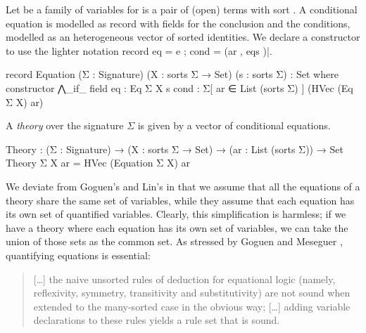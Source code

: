 Let  be a family of
variables for  is a pair of (open)
terms with sort . A conditional equation is modelled as record with
fields for the conclusion and the conditions, modelled as an
heterogeneous vector of sorted identities. We declare a constructor
to use the lighter notation record {
  eq = e ; cond = (ar , eqs )}|.
\begin{spec}
record Equation (Σ : Signature) (X : sorts Σ → Set) (s : sorts Σ) : Set where
  constructor ⋀_if_
  field
    eq     :   Eq Σ X s
    cond   :   Σ[ ar ∈ List (sorts Σ) ] (HVec (Eq Σ X) ar)
\end{spec}
\noindent A \emph{theory} over the signature $\Sigma$ is given by a
vector of conditional equations.
\begin{spec}
Theory : (Σ : Signature) → (X : sorts Σ → Set) → (ar : List (sorts Σ)) → Set
Theory Σ X ar = HVec (Equation Σ X) ar
\end{spec}
We deviate from Goguen's and Lin's in that we assume that all the
equations of a theory share the same set of variables, while they
assume that each equation has its own set of quantified
variables. Clearly, this simplification is harmless; if we have a
theory where each equation has its own set of variables, we can take
the union of those sets as the common set. As stressed by Goguen and
Meseguer \cite{goguen-remarks-87}, quantifying equations is essential:
\begin{quote}
  [\ldots] the naive unsorted rules of deduction for equational logic
  (namely, reflexivity, symmetry, transitivity and substitutivity) are
  not sound when extended to the many-sorted case in the obvious way;
  [\ldots] adding variable declarations to these rules
  yields a rule set that is sound.
\end{quote}


